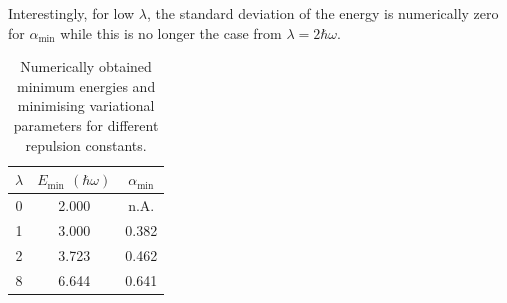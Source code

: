 \documentclass[a4paper,DIV=12,english]{scrartcl}
\begin{document}
Interestingly, for low $\lambda$, the standard deviation of the energy is numerically zero for $\alpha_\text{min}$ while this is no longer the case from $\lambda=2\hbar\omega$.

\begin{table}
    \centering
    \caption{Numerically obtained minimum energies and minimising variational parameters for different repulsion constants.}
    \vspace{0.25cm}
    \begin{tabular}{c|c|c}
        $\lambda$ & $E_\text{min}$ $(\hbar\omega)$ & $\alpha_\text{min}$\\
        \hline
        0 & 2.000 & n.A. \\
        1 & 3.000 & 0.382\\
        2 & 3.723 & 0.462 \\
        8 & 6.644 & 0.641 \\
    \end{tabular}
    \label{tab:results}
\end{table}
\end{document}
